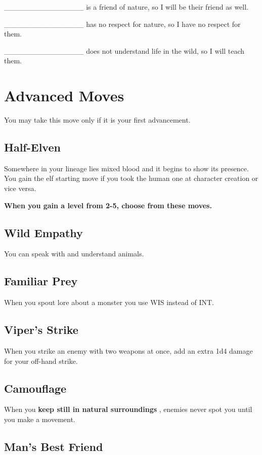 \_\_\_\_\_\_\_\_\_\_\_\_\_\_\_ is a friend of nature, so I will be their friend as well.

\_\_\_\_\_\_\_\_\_\_\_\_\_\_\_ has no respect for nature, so I have no respect for them.

\_\_\_\_\_\_\_\_\_\_\_\_\_\_\_ does not understand life in the wild, so I will teach them.
\section*{Advanced Moves}

You may take this move only if it is your first advancement.
\subsection{Half-Elven}

Somewhere in your lineage lies mixed blood and it begins to show its presence. You gain the elf starting move if you took the human one at character creation or vice versa.

\vspace{\baselineskip}
{\bfseries When you gain a level from 2-5, choose from these moves.}
\subsection{Wild Empathy}

You can speak with and understand animals.
\subsection{Familiar Prey}

When you spout lore about a monster you use WIS instead of INT.
\subsection{Viper's Strike}

When you strike an enemy with two weapons at once, add an extra 1d4 damage for your off-hand strike.
\subsection{Camouflage}

When you \textbf{keep still in natural surroundings}
, enemies never spot you until you make a movement.
\subsection{Man's Best Friend}

